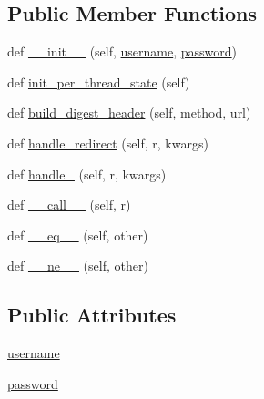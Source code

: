 \subsection*{Public Member Functions}
\begin{DoxyCompactItemize}
\item 
def \hyperlink{classpip_1_1__vendor_1_1requests_1_1auth_1_1HTTPDigestAuth_a98ebea27b3bb89b9953b7f466bd396e3}{\+\_\+\+\_\+init\+\_\+\+\_\+} (self, \hyperlink{classpip_1_1__vendor_1_1requests_1_1auth_1_1HTTPDigestAuth_a2c23d0bcbff2cc061eb98b4f000ceeed}{username}, \hyperlink{classpip_1_1__vendor_1_1requests_1_1auth_1_1HTTPDigestAuth_a1f8c4df663a728720f6214426f9157a4}{password})
\item 
def \hyperlink{classpip_1_1__vendor_1_1requests_1_1auth_1_1HTTPDigestAuth_a9d566117b579fd34e43b19e0d70ee374}{init\+\_\+per\+\_\+thread\+\_\+state} (self)
\item 
def \hyperlink{classpip_1_1__vendor_1_1requests_1_1auth_1_1HTTPDigestAuth_abde421db9e46c01b7f2d5b78b6cc3c07}{build\+\_\+digest\+\_\+header} (self, method, url)
\item 
def \hyperlink{classpip_1_1__vendor_1_1requests_1_1auth_1_1HTTPDigestAuth_a1803cfa961b39dfc993496d11ced05ae}{handle\+\_\+redirect} (self, r, kwargs)
\item 
def \hyperlink{classpip_1_1__vendor_1_1requests_1_1auth_1_1HTTPDigestAuth_ad8c9a9ef9df9a3bf41bf152e4d645b07}{handle\+\_} (self, r, kwargs)
\item 
def \hyperlink{classpip_1_1__vendor_1_1requests_1_1auth_1_1HTTPDigestAuth_a403b3cedf8530a7cc8e01e9185ba0f75}{\+\_\+\+\_\+call\+\_\+\+\_\+} (self, r)
\item 
def \hyperlink{classpip_1_1__vendor_1_1requests_1_1auth_1_1HTTPDigestAuth_a1d3b6ec646382ddb74cb9c6010f1974a}{\+\_\+\+\_\+eq\+\_\+\+\_\+} (self, other)
\item 
def \hyperlink{classpip_1_1__vendor_1_1requests_1_1auth_1_1HTTPDigestAuth_a69b7c1310c84a6f29ebe1c3f6ada8425}{\+\_\+\+\_\+ne\+\_\+\+\_\+} (self, other)
\end{DoxyCompactItemize}
\subsection*{Public Attributes}
\begin{DoxyCompactItemize}
\item 
\hyperlink{classpip_1_1__vendor_1_1requests_1_1auth_1_1HTTPDigestAuth_a2c23d0bcbff2cc061eb98b4f000ceeed}{username}
\item 
\hyperlink{classpip_1_1__vendor_1_1requests_1_1auth_1_1HTTPDigestAuth_a1f8c4df663a728720f6214426f9157a4}{password}
\end{DoxyCompactItemize}


